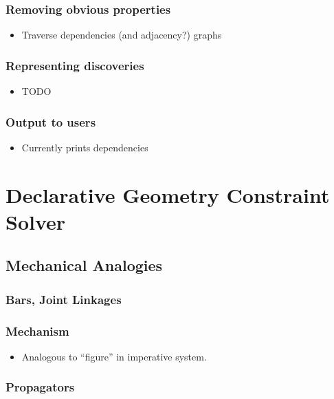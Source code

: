 \documentclass[11pt]{article}
\begin{document}
\subsubsection{Removing obvious properties}
\label{sec-3-8-2}

\begin{itemize}
\item Traverse dependencies (and adjacency?) graphs
\end{itemize}
\subsubsection{Representing discoveries}
\label{sec-3-8-3}

\begin{itemize}
\item TODO
\end{itemize}
\subsubsection{Output to users}
\label{sec-3-8-4}

\begin{itemize}
\item Currently prints dependencies
\end{itemize}
\section{Declarative Geometry Constraint Solver}
\label{sec-4}
\subsection{Mechanical Analogies}
\label{sec-4-1}
\subsubsection{Bars, Joint Linkages}
\label{sec-4-1-1}
\subsubsection{Mechanism}
\label{sec-4-1-2}

\begin{itemize}
\item Analogous to ``figure'' in imperative system.
\end{itemize}
\subsubsection{Propagators}
\label{sec-4-1-3}
\end{document}
